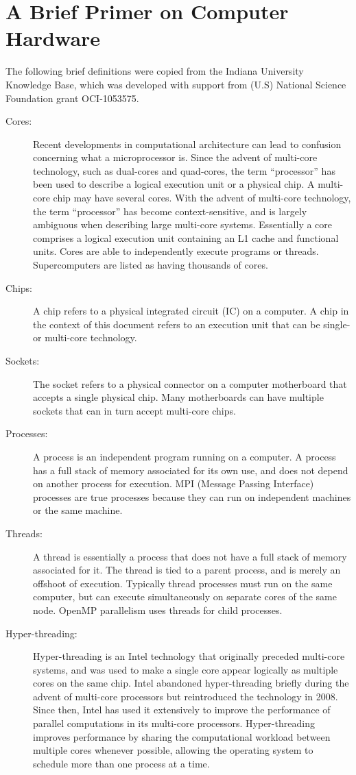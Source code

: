 \documentclass[11pt]{book}
\begin{document}
\section{A Brief Primer on Computer Hardware}

The following brief definitions were copied from the Indiana University Knowledge Base, which was developed with support from (U.S) National Science Foundation grant OCI-1053575.
\begin{description}
\item[Cores:] Recent developments in computational architecture can lead to confusion concerning what a microprocessor is. Since the advent of multi-core technology, such as dual-cores and quad-cores, the term ``processor'' has been used to describe a logical execution unit or a physical chip. A multi-core chip may have several cores. With the advent of multi-core technology, the term ``processor'' has become context-sensitive, and is largely ambiguous when describing large multi-core systems. Essentially a core comprises a logical execution unit containing an L1 cache and functional units. Cores are able to independently execute programs or threads. Supercomputers are listed as having thousands of cores.
\item[Chips:] A chip refers to a physical integrated circuit (IC) on a computer. A chip in the context of this document refers to an execution unit that can be single- or multi-core technology.
\item[Sockets:] The socket refers to a physical connector on a computer motherboard that accepts a single physical chip. Many motherboards can have multiple sockets that can in turn accept multi-core chips.
\item[Processes:] A process is an independent program running on a computer. A process has a full stack of memory associated for its own use, and does not depend on another process for execution. MPI (Message Passing Interface) processes are true processes because they can run on independent machines or the same machine.
\item[Threads:] A thread is essentially a process that does not have a full stack of memory associated for it. The thread is tied to a parent process, and is merely an offshoot of execution. Typically thread processes must run on the same computer, but can execute simultaneously on separate cores of the same node. OpenMP parallelism uses threads for child processes.
\item[Hyper-threading:] Hyper-threading is an Intel technology that originally preceded multi-core systems, and was used to make a single core appear logically as multiple cores on the same chip. Intel abandoned hyper-threading briefly during the advent of multi-core processors but reintroduced the technology in 2008. Since then, Intel has used it extensively to improve the performance of parallel computations in its multi-core processors. Hyper-threading improves performance by sharing the computational workload between multiple cores whenever possible, allowing the operating system to schedule more than one process at a time.

\end{description}
\end{document}
